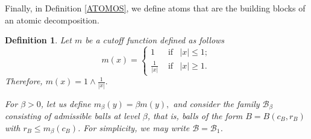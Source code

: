 \documentclass[leqno,11pt]{amsart}
\theoremstyle{plain}
\newtheorem{defi}{Definition}
\theoremstyle{remark}
\begin{document}
  Finally, in Definition \ref{ATOMOS}, we define atoms that are the building blocks of an atomic decomposition.


\begin{defi}\label{cutting} Let $m$ be a cutoff function defined as follows
\[m(x)=\left\{\begin{array}{ccl}
     1 & \textrm{ if} & |x|\leq 1; \\
     \frac{1}{|x|} & \textrm{ if} & |x|\geq 1.
\end{array}\right.\] Therefore, $m(x)=1\wedge \frac{1}{|x|}.$

For $\beta>0$, let us define $m_\beta (y)=\beta m(y),$ and consider the family $\mathscr{B}_\beta$ consisting of \textit{admissible balls at level $\beta$}, that is, balls of the form $B=B(c_B,r_B)$ with $r_B\leq  m_\beta (c_B)$. For simplicity, we may write $\mathscr{B}=\mathscr{B}_1$.
\end{defi}
\end{document}
